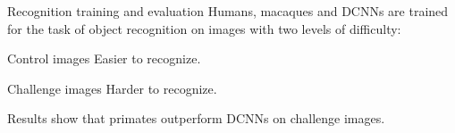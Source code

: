 \begin{casestudy}
    \phantom{}
    \begin{descriptionlist}
        \item[Recognition training and evaluation] 
            Humans, macaques and DCNNs are trained for the task of object recognition on
            images with two levels of difficulty:
            \begin{descriptionlist}
                \item[Control images] Easier to recognize.
                \item[Challenge images] Harder to recognize.
            \end{descriptionlist}
            Results show that primates outperform DCNNs on challenge images.
        

\end{descriptionlist}
\end{casestudy}
